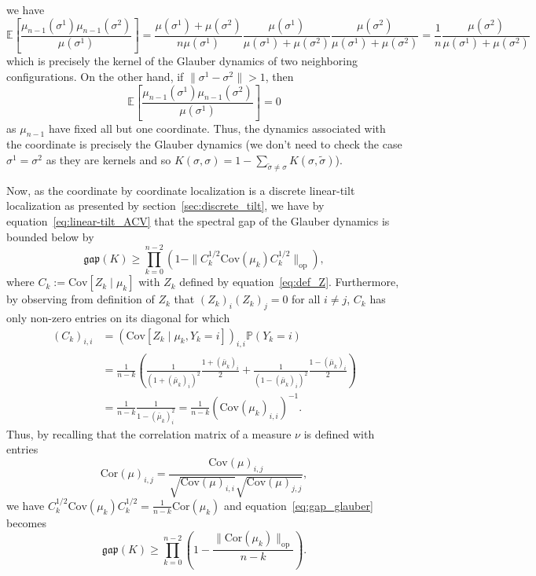 we have 
\[\mathbb{E}\left[\frac{\mu_{n - 1}(\sigma^1)\mu_{n - 1}(\sigma^2)}{\mu(\sigma^1)}\right] =
  \frac{\mu(\sigma^1) + \mu(\sigma^2)}{n\mu(\sigma^1)}
  \frac{\mu(\sigma^1)}{\mu(\sigma^1) + \mu(\sigma^2)} 
  \frac{\mu(\sigma^2)}{\mu(\sigma^1) + \mu(\sigma^2)} = 
  \frac{1}{n} \frac{\mu(\sigma^2)}{\mu(\sigma^1) + \mu(\sigma^2)}\]
which is precisely the kernel of the Glauber dynamics of two neighboring configurations. 
On the other hand, if \(\|\sigma^1 - \sigma^2\| > 1\), then 
\[\mathbb{E}\left[\frac{\mu_{n - 1}(\sigma^1)\mu_{n - 1}(\sigma^2)}{\mu(\sigma^1)}\right] = 0\] 
as \(\mu_{n - 1}\) have fixed all but one coordinate. Thus, the dynamics associated with the coordinate 
is precisely the Glauber dynamics (we don't need to check the case \(\sigma^1 = \sigma^2\) as they are 
kernels and so \(K(\sigma, \sigma) = 1 - \sum_{\tilde \sigma \neq \sigma}K(\sigma, \tilde \sigma)\)).

Now, as the coordinate by coordinate localization is a discrete linear-tilt localization as presented 
by section~\ref{sec:discrete_tilt}, we have by equation~\eqref{eq:linear-tilt_ACV} that the spectral gap of 
the Glauber dynamics is bounded below by
\begin{equation}\label{eq:gap_glauber}
  \mathfrak{gap}(K) \ge \prod_{k = 0}^{n - 2} (1 - \|C_k^{1 / 2} \text{Cov}(\mu_k) C_k^{1 / 2}\|_{\text{op}}),
\end{equation}
where \(C_k := \text{Cov}[Z_k \mid \mu_k]\) with \(Z_k\) defined by equation~\eqref{eq:def_Z}. Furthermore, 
by observing from definition of \(Z_k\) that \((Z_k)_i (Z_k)_j = 0\) for all \(i \neq j\), 
\(C_k\) has only non-zero entries on its diagonal for which 
\begin{align*}
  (C_k)_{i, i} &= (\text{Cov}[Z_k \mid \mu_k, Y_k = i])_{i, i} \mathbb{P}(Y_k = i)\\
  & = \frac{1}{n - k}\left(\frac{1}{(1 + (\bar{\mu}_k)_i)^2}\frac{1 + (\bar{\mu}_k)_i}{2} + 
    \frac{1}{(1 - (\bar{\mu}_k)_i)^2}\frac{1 - (\bar{\mu}_k)_i}{2}\right)\\
  & = \frac{1}{n - k}\frac{1}{1 - (\bar{\mu}_k)_i^2} 
    = \frac{1}{n - k}(\text{Cov}(\mu_k)_{i, i})^{-1}.
\end{align*}
Thus, by recalling that the correlation matrix of a measure \(\nu\) is defined with entries 
\[\text{Cor}(\mu)_{i, j} = \frac{\text{Cov}(\mu)_{i, j}}{\sqrt{\text{Cov}(\mu)_{i, i}}\sqrt{\text{Cov}(\mu)_{j, j}}},\]
we have \(C_k^{1 / 2} \text{Cov}(\mu_k) C_k^{1 / 2} = \frac{1}{n - k}\text{Cor}(\mu_k)\) and 
equation~\eqref{eq:gap_glauber} becomes
\begin{equation}
  \mathfrak{gap}(K) \ge \prod_{k = 0}^{n - 2} \left(1 - \frac{\|\text{Cor}(\mu_k)\|_{\text{op}}}{n - k}\right).
\end{equation}


